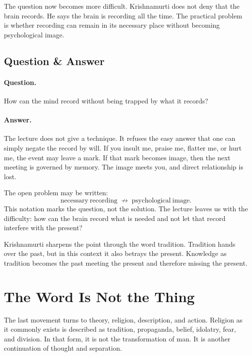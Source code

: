 The question now becomes more difficult. Krishnamurti does not deny that the brain records. He says the brain is recording all the time. The practical problem is whether recording can remain in its necessary place without becoming psychological image.

\subsection{Question \& Answer}

\paragraph{Question.}
How can the mind record without being trapped by what it records?

\paragraph{Answer.}
The lecture does not give a technique. It refuses the easy answer that one can simply negate the record by will. If you insult me, praise me, flatter me, or hurt me, the event may leave a mark. If that mark becomes image, then the next meeting is governed by memory. The image meets you, and direct relationship is lost.

The open problem may be written:
\begin{equation}
\mathrm{necessary\ recording}
\;\not\longrightarrow\;
\mathrm{psychological\ image}.
\end{equation}
This notation marks the question, not the solution. The lecture leaves us with the difficulty: how can the brain record what is needed and not let that record interfere with the present?

Krishnamurti sharpens the point through the word tradition. Tradition hands over the past, but in this context it also betrays the present. Knowledge as tradition becomes the past meeting the present and therefore missing the present.

\section{The Word Is Not the Thing}

The last movement turns to theory, religion, description, and action. Religion as it commonly exists is described as tradition, propaganda, belief, idolatry, fear, and division. In that form, it is not the transformation of man. It is another continuation of thought and separation.


